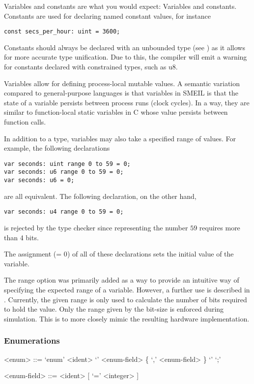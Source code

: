 Variables and constants are what you would expect: Variables and
constants. Constants are used for declaring named constant values, for instance
\begin{lstlisting}[language=smeil]
const secs_per_hour: uint = 3600;
\end{lstlisting}
Constants should always be declared with an unbounded type (see
) as it allows for more accurate type unification. Due to
this, the compiler will emit a warning for constants declared with constrained
types, such as {\ttfamily u8}.

Variables allow for defining process-local mutable values. A semantic variation
compared to general-purpose languages is that variables in SMEIL is that the
state of a variable persists between process runs (clock cycles). In a way, they
are similar to function-local {\ttfamily static} variables in C whose value
persists between function calls.

In addition to a type, variables may also take a specified {\ttfamily range} of
values. For example, the following declarations
\begin{lstlisting}[language=smeil]
var seconds: uint range 0 to 59 = 0;
var seconds: u6 range 0 to 59 = 0;
var seconds: u6 = 0;
\end{lstlisting}
are all equivalent. The following declaration, on the other hand,
\begin{lstlisting}[language=smeil]
var seconds: u4 range 0 to 59 = 0;
\end{lstlisting}
is rejected by the type checker since representing the number $59$ requires more
than 4 bits.

The assignment ({\ttfamily = 0}) of all of these declarations sets the initial
value of the variable.

The {\ttfamily range} option was primarily added as a way to provide an
intuitive way of specifying the expected range of a variable. However, a further
use is described in . Currently, the given range is only used to
calculate the number of bits required to hold the value. Only the range given by
the bit-size is enforced during simulation. This is to more closely mimic the
resulting hardware implementation.

\subsubsection{Enumerations}
\begin{grammar}
<enum> ::= `enum' <ident> `{' <enum-field> \{ `,' <enum-field>  \} `}' `;'

<enum-field> ::= <ident> [ `=' <integer> ]
\end{grammar}

